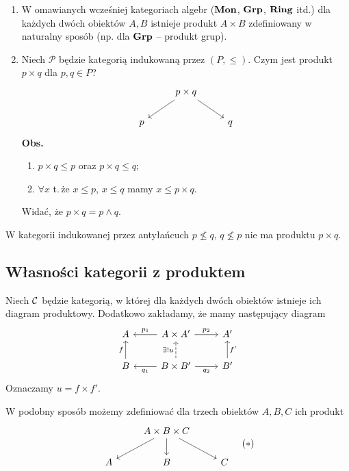 \begin{przyklad}
\leavevmode
\begin{enumerate}
\item W omawianych wcześniej kategoriach algebr ($\mathbf{Mon}$, $\mathbf{Grp}$, $\mathbf{Ring}$ itd.) dla każdych dwóch obiektów $A, B$ istnieje produkt $A \times B$ zdefiniowany w naturalny sposób (np. dla $\mathbf{Grp}$ -- produkt grup).

\item Niech $\mathcal{P}$ będzie kategorią indukowaną przez $(P, \leq)$. Czym jest produkt $p \times q$ dla $p, q \in P$?
\[
\begin{tikzcd}
& p \times q \arrow[dl] \arrow[dr] & \\
p & & q
\end{tikzcd}
\]
\textbf{Obs.}
\begin{enumerate}
\item[a)] $p \times q \leq p$ oraz $p \times q \leq q$;
\item[b)] $\forall x$ t.\,że $x \leq p$, $x \leq q$ mamy $x \leq p \times q$.
\end{enumerate}
Widać, że $p \times q = p \wedge q$.
\end{enumerate}
\end{przyklad}

\begin{uwaga}
W kategorii indukowanej przez antyłańcuch $p \not\leq q$, $q \not\leq p$ nie ma produktu $p \times q$.
\end{uwaga}

\subsection*{Własności kategorii z produktem}

Niech $\mathcal{C}$ będzie kategorią, w której dla każdych dwóch obiektów istnieje ich diagram produktowy. Dodatkowo zakładamy, że mamy następujący diagram
\[
\begin{tikzcd}
A & A \times A' \arrow[l, "p_1"'] \arrow[r, "p_2"] & A' \\
B \arrow[u, "f"] & B \times B' \arrow[l, "q_1"] \arrow[r, "q_2"'] \arrow[u, dashed, "\exists! u"] & B' \arrow[u, "f'"']
\end{tikzcd}
\]
Oznaczamy $u = f \times f'$.

W podobny sposób możemy zdefiniować dla trzech obiektów $A, B, C$ ich produkt
\[
\begin{tikzcd}
& A \times B \times C \arrow[dl] \arrow[d] \arrow[dr] & \\
A & B & C
\end{tikzcd}
\quad (\ast)
\]

